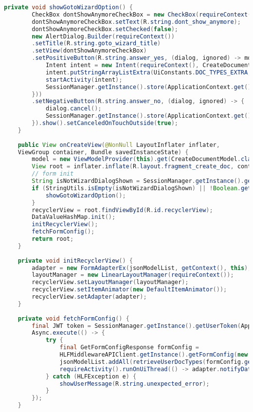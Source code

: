 \begin{lstlisting}[language=Java]
	private void showGotoWizardOption() {
		CheckBox dontShowAnymoreCheckBox = new CheckBox(requireContext());
		dontShowAnymoreCheckBox.setText(R.string.dont_show_anymore);
		dontShowAnymoreCheckBox.setChecked(false);
		new AlertDialog.Builder(requireContext())
		.setTitle(R.string.goto_wizard_title)
		.setView(dontShowAnymoreCheckBox)
		.setPositiveButton(R.string.answer_yes, (dialog, ignored) -> model.getDocTypes().observe(getViewLifecycleOwner(), docTypes -> {
			Intent intent = new Intent(requireContext(), CreateDocumentWizardActivity.class);
			intent.putStringArrayListExtra(UiConstants.DOC_TYPES_EXTRA, new ArrayList<>(docTypes));
			startActivity(intent);
			SessionManager.getInstance().store(ApplicationContext.get(), DONT_SHOW_WIZARD_DIALOG_FLAG_KEY, Boolean.toString(dontShowAnymoreCheckBox.isChecked()));
		}))
		.setNegativeButton(R.string.answer_no, (dialog, ignored) -> {
			dialog.cancel();
			SessionManager.getInstance().store(ApplicationContext.get(), DONT_SHOW_WIZARD_DIALOG_FLAG_KEY, Boolean.toString(dontShowAnymoreCheckBox.isChecked()));
		}).show().setCanceledOnTouchOutside(true);
	}
	
	public View onCreateView(@NonNull LayoutInflater inflater,
	ViewGroup container, Bundle savedInstanceState) {
		model = new ViewModelProvider(this).get(CreateDocumentModel.class);
		View root = inflater.inflate(R.layout.fragment_create_doc, container, false);
		// form init
		String isNotWizardDialogShown = SessionManager.getInstance().get(ApplicationContext.get(), DONT_SHOW_WIZARD_DIALOG_FLAG_KEY);
		if (StringUtils.isEmpty(isNotWizardDialogShown) || !Boolean.getBoolean(isNotWizardDialogShown)) {
			showGotoWizardOption();
		}
		recyclerView = root.findViewById(R.id.recyclerView);
		DataValueHashMap.init();
		initRecyclerView();
		fetchFormConfig();
		return root;
	}
	
	private void initRecyclerView() {
		adapter = new FormAdapterEx(jsonModelList, getContext(), this);
		layoutManager = new LinearLayoutManager(requireContext());
		recyclerView.setLayoutManager(layoutManager);
		recyclerView.setItemAnimator(new DefaultItemAnimator());
		recyclerView.setAdapter(adapter);
	}
	
	private void fetchFormConfig() {
		final JWT token = SessionManager.getInstance().getUserToken(ApplicationContext.get()).orElseThrow(IllegalStateException::new);
		Async.execute(() -> {
			try {
				final GetFormConfigResponse formConfig =
				HLFMiddlewareAPIClient.getInstance().getFormConfig(new GetFormConfigRequest(), token.toString());
				jsonModelList.addAll(retrieveUserDocTypes(formConfig.getConfig()));
				requireActivity().runOnUiThread(() -> adapter.notifyDataSetChanged());
			} catch (HLFException e) {
				showUserMessage(R.string.unexpected_error);
			}
		});
	}
	

\end{lstlisting}
